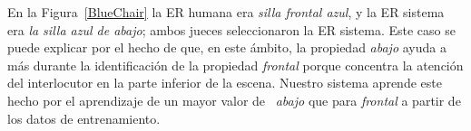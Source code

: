 \begin{table}[H]

En la Figura~\ref{BlueChair} la ER humana era {\it silla frontal azul}, y la ER sistema era {\it la silla azul de abajo}; ambos jueces seleccionaron la ER sistema. Este caso se puede explicar por el hecho de que, en este \'ambito, la propiedad {\it abajo} ayuda a m\'as durante la identificaci\'on de la propiedad {\it frontal} porque concentra la atenci\'on del interlocutor en la parte inferior de la escena. Nuestro sistema aprende este hecho por el aprendizaje de un mayor valor de \puse\ {\it abajo} que para {\it frontal} a partir de los datos de entrenamiento.


\end{table}
